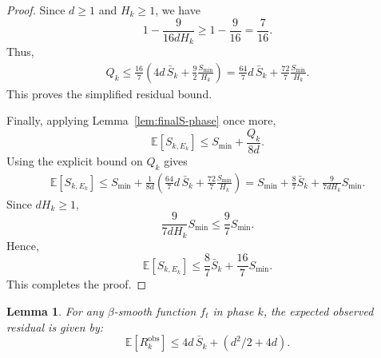 \documentclass[journal,onecolumn]{IEEEtran}
\theoremstyle{plain}
\newtheorem{lemma}[theorem]{Lemma}
\theoremstyle{definition}
\theoremstyle{remark}
\begin{document}
{\begin{proof}
Since $d\ge1$ and $H_k\ge1$, we have
\begin{equation*}
    1-\frac{9}{16dH_k}
    \ge
    1-\frac{9}{16}
    =
    \frac{7}{16}.
\end{equation*}
Thus,
\begin{equation*}
\begin{aligned}
    Q_k
    \le
    \frac{16}{7}
    \left(
        4d\,\bar S_k
        +
        \frac{9}{2}\frac{S_{\min}}{H_k}
    \right) =
    \frac{64}{7}d\,\bar S_k
    +
    \frac{72}{7}\frac{S_{\min}}{H_k}.
\end{aligned}
\end{equation*}
This proves the simplified residual bound.

Finally, applying Lemma~\ref{lem:finalS-phase} once more,
\begin{equation*}
    \mathbb E[S_{k,E_k}]
    \le
    S_{\min}
    +
    \frac{Q_k}{8d}.
\end{equation*}
Using the explicit bound on $Q_k$ gives
\begin{equation*}
\begin{aligned}
    \mathbb E[S_{k,E_k}]
    \le
    S_{\min}
    +
    \frac{1}{8d}
    \left(
        \frac{64}{7}d\,\bar S_k
        +
        \frac{72}{7}\frac{S_{\min}}{H_k}
    \right) =
    S_{\min}
    +
    \frac{8}{7}\bar S_k
    +
    \frac{9}{7dH_k}S_{\min}.
\end{aligned}
\end{equation*}
Since $dH_k\ge1$,
\begin{equation*}
    \frac{9}{7dH_k}S_{\min}
    \le
    \frac97S_{\min}.
\end{equation*}
Hence,
\begin{equation*}
    \mathbb E[S_{k,E_k}]
    \le
    \frac87\bar S_k
    +
    \frac{16}{7}S_{\min}.
\end{equation*}
This completes the proof.
\end{proof}

\iffalse
\begin{lemma}
    \label{lem:phase-residual-vs-Sbar} For any $\beta$-smooth function $f_t$ in phase $k$, the expected
    observed residual is given by:
    \begin{equation*}
        \mathbb{E}[R^{\mathrm{obs}}_{k}] \le 4d\,\bar S_{k} + (d^{2}/2+4d).
    \end{equation*}
\end{lemma}

}
\end{document}
